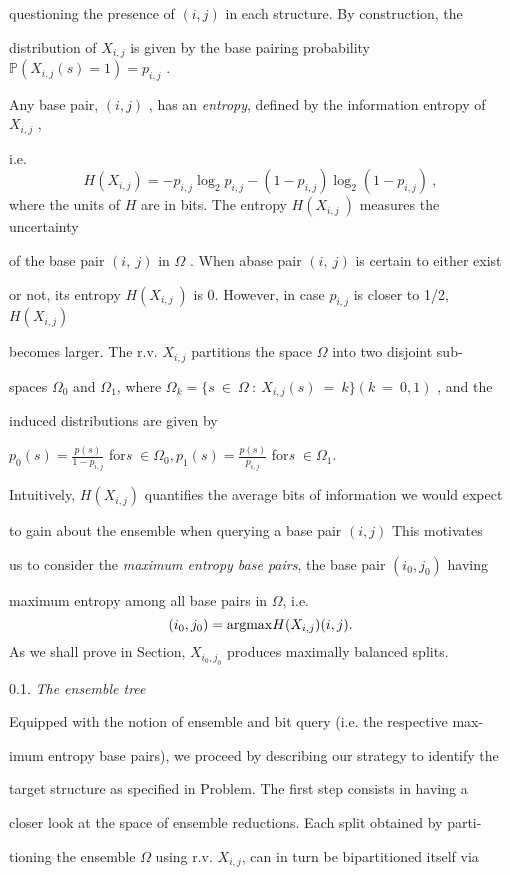 \documentclass[a4paper,12pt]{article}
\begin{document}
questioning the presence of $(i,j)$ in each structure. By construction, the

distribution of $X_{i,j}$ is given by the base pairing probability $\mathbb{P}(X_{i,j}(s)=1)=p_{i,j}$ .

Any base pair, $(i,j)$ , has an {\it entropy}, defined by the information entropy of $X_{i,j}$ ,

i.e.
$$
H(X_{i,j})=-p_{i,j}\log_{2}p_{i,j}-(1-p_{i,j})\log_{2}(1-p_{i,j})\ ,
$$
where the units of $H$ are in bits. The entropy $H (X_{i,j}\ )$ measures the uncertainty

of the base pair $(i,\ j)$ in $\Omega$ . When abase pair $(i,\ j)$ is certain to either exist

or not, its entropy $H (X_{i,j}\ )$ is $0$. However, in case $p_{i,j}$ is closer to 1/2, $H(X_{i,j})$

becomes larger. The r.v. $X_{i,j}$ partitions the space $\Omega$ into two disjoint sub-

spaces $\Omega_{0}$ and $\Omega_{1}$, where $\Omega_{k} = \{s\ \in\ \Omega\ :\ X_{i,j}(s)\ =\ k\} (k\ =\ 0,1)$ , and the

induced distributions are given by

$p_{0}(s)=\displaystyle \frac{p(s)}{1-p_{i,j}}$ for{\it s} $\in\Omega_{0}, p_{1}(s)=\displaystyle \frac{p(s)}{p_{i,j}}$ for{\it s} $\in\Omega_{1}.$

Intuitively, $H(X_{i,j})$ quantifies the average bits of information we would expect

to gain about the ensemble when querying a base pair $(i,j)$ This motivates

us to consider the {\it maximum entropy base pairs}, the base pair $(i_{0},j_{0})$ having

maximum entropy among all base pairs in $\Omega$, i.e.
$$
(i_{0},j_{0})={\rm argmax} H(X_{i,j})(i,j).
$$
As we shall prove in Section, $X_{i_{0},j_{0}}$ produces maximally balanced splits.

0.1. {\it The ensemble tree}

Equipped with the notion of ensemble and bit query (i.e. the respective max-

imum entropy base pairs), we proceed by describing our strategy to identify the

target structure as specified in Problem. The first step consists in having a

closer look at the space of ensemble reductions. Each split obtained by parti-

tioning the ensemble $\Omega$ using r.v. $X_{i,j}$, can in turn be bipartitioned itself via
\end{document}
